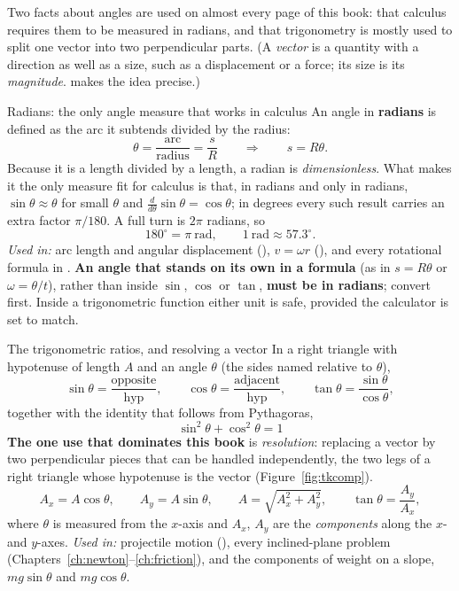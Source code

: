 Two facts about angles are used on almost every page of this book: that calculus requires them to be
measured in radians, and that trigonometry is mostly used to split one vector into two perpendicular parts.
(A \emph{vector} is a quantity with a direction as well as a size, such as a displacement or a force;
its size is its \emph{magnitude}.  makes the idea precise.)

\begin{defbox}{Radians: the only angle measure that works in calculus}
An angle in \textbf{radians} is defined as the arc it subtends divided by the radius:
\[
\theta=\frac{\text{arc}}{\text{radius}}=\frac{s}{R}\qquad\Longrightarrow\qquad s=R\theta.
\]
Because it is a length divided by a length, a radian is \emph{dimensionless}. What makes it the only
measure fit for calculus is that, in radians and only in radians, $\sin\theta\approx\theta$ for small
$\theta$ and $\frac{d}{d\theta}\sin\theta=\cos\theta$; in degrees every such result carries an extra
factor $\pi/180$. A full turn is $2\pi$ radians, so
\[
180^\circ=\pi\ \text{rad},\qquad 1\ \text{rad}\approx57.3^\circ.
\]
\emph{Used in:} arc length and angular displacement (), $v=\omega r$ (), and every
rotational formula in . \textbf{An angle that stands on its own in a
formula} (as in $s=R\theta$ or $\omega=\theta/t$), rather than inside $\sin$, $\cos$ or $\tan$,
\textbf{must be in radians}; convert first. Inside a trigonometric function either unit is safe,
provided the calculator is set to match.
\end{defbox}

\begin{defbox}{The trigonometric ratios, and resolving a vector}
In a right triangle with hypotenuse of length $A$ and an angle $\theta$ (the sides named relative to $\theta$),
\[
\sin\theta=\frac{\text{opposite}}{\text{hyp}},\qquad
\cos\theta=\frac{\text{adjacent}}{\text{hyp}},\qquad
\tan\theta=\frac{\sin\theta}{\cos\theta},
\]
together with the identity that follows from Pythagoras,
\[
\boxed{\;\sin^{2}\theta+\cos^{2}\theta=1\;}
\]
\textbf{The one use that dominates this book} is \emph{resolution}: replacing a vector by two
perpendicular pieces that can be handled independently, the two legs of a right triangle whose hypotenuse
is the vector (Figure~\ref{fig:tkcomp}).
\[
A_x=A\cos\theta,\qquad A_y=A\sin\theta,\qquad
A=\sqrt{A_x^{2}+A_y^{2}},\qquad \tan\theta=\frac{A_y}{A_x},
\]
where $\theta$ is measured from the $x$-axis and $A_x$, $A_y$ are the \emph{components} along the $x$- and
$y$-axes. \emph{Used in:} projectile motion (), every inclined-plane problem
(Chapters~\ref{ch:newton}--\ref{ch:friction}), and the components
of weight on a slope, $mg\sin\theta$ and $mg\cos\theta$.
\end{defbox}

